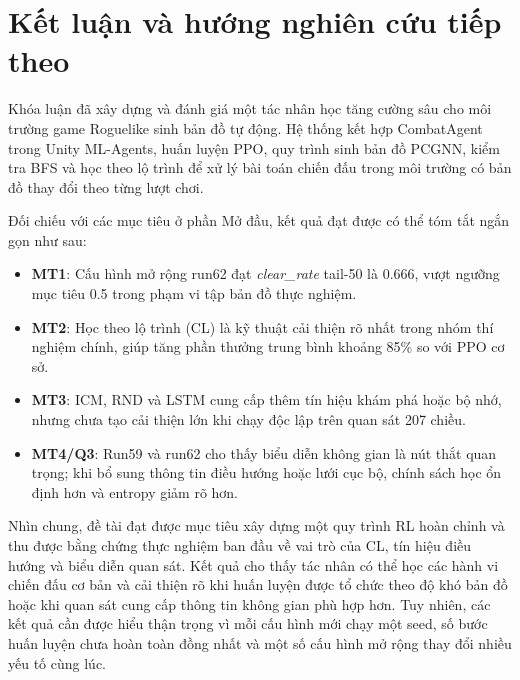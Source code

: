\clearpage
{}

\chapter*{Kết luận và hướng nghiên cứu tiếp theo}


Khóa luận đã xây dựng và đánh giá một tác nhân học tăng cường sâu cho môi trường game Roguelike sinh bản đồ tự động. Hệ thống kết hợp CombatAgent trong Unity ML-Agents, huấn luyện PPO, quy trình sinh bản đồ PCGNN, kiểm tra BFS và học theo lộ trình để xử lý bài toán chiến đấu trong môi trường có bản đồ thay đổi theo từng lượt chơi.

Đối chiếu với các mục tiêu ở phần Mở đầu, kết quả đạt được có thể tóm tắt ngắn gọn như sau:

\renewcommand{\labelitemi}{$-$}
\begin{itemize}
    \item \textbf{MT1}: Cấu hình mở rộng run62 đạt \textit{clear\_rate} tail-50 là 0.666, vượt ngưỡng mục tiêu 0.5 trong phạm vi tập bản đồ thực nghiệm.
    \item \textbf{MT2}: Học theo lộ trình (CL) là kỹ thuật cải thiện rõ nhất trong nhóm thí nghiệm chính, giúp tăng phần thưởng trung bình khoảng 85\% so với PPO cơ sở.
    \item \textbf{MT3}: ICM, RND và LSTM cung cấp thêm tín hiệu khám phá hoặc bộ nhớ, nhưng chưa tạo cải thiện lớn khi chạy độc lập trên quan sát 207 chiều.
    \item \textbf{MT4/Q3}: Run59 và run62 cho thấy biểu diễn không gian là nút thắt quan trọng; khi bổ sung thông tin điều hướng hoặc lưới cục bộ, chính sách học ổn định hơn và entropy giảm rõ hơn.
\end{itemize}

Nhìn chung, đề tài đạt được mục tiêu xây dựng một quy trình RL hoàn chỉnh và thu được bằng chứng thực nghiệm ban đầu về vai trò của CL, tín hiệu điều hướng và biểu diễn quan sát. Kết quả cho thấy tác nhân có thể học các hành vi chiến đấu cơ bản và cải thiện rõ khi huấn luyện được tổ chức theo độ khó bản đồ hoặc khi quan sát cung cấp thông tin không gian phù hợp hơn. Tuy nhiên, các kết quả cần được hiểu thận trọng vì mỗi cấu hình mới chạy một seed, số bước huấn luyện chưa hoàn toàn đồng nhất và một số cấu hình mở rộng thay đổi nhiều yếu tố cùng lúc.

